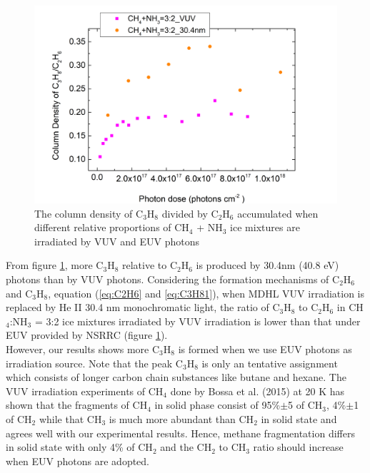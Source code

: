 \begin{figure}
\centering
\includegraphics[width=\textwidth]{figures/chapter3/VUV_EUV_C3H8_C2H6.png}
\caption{The column density of C$_3$H$_8$ divided by C$_2$H$_6$ accumulated when different relative proportions of CH$_4$ + NH$_3$ ice mixtures are irradiated by VUV and EUV photons}
\label{fig:NSRRC_Lab_C3H8_C2H6}
\end{figure}


From figure \ref{fig:NSRRC_Lab_C3H8_C2H6}, more C$_3$H$_8$ relative to C$_2$H$_6$ is produced by 30.4nm (40.8 eV) photons than by VUV photons. Considering the formation mechanisms of C$_2$H$_6$ and C$_3$H$_8$, equation (\ref{eq:C2H6} and \ref{eq:C3H81}), when MDHL VUV irradiation is replaced by He II 30.4 nm monochromatic light, the ratio of C$_3$H$_8$ to C$_2$H$_6$ in CH$_4$:NH$_3$ = 3:2 ice mixtures irradiated by VUV irradiation is lower than that under EUV provided by NSRRC (figure \ref{fig:NSRRC_Lab_C3H8_C2H6}).\\

 However, our results shows more C$_3$H$_8$ is formed when we use EUV photons as irradiation source. Note that the peak C$_3$H$_8$ is only an tentative assignment which consists of longer carbon chain substances like butane and hexane. The VUV irradiation experiments of CH$_4$ done by Bossa et al. (2015)\cite{bossa2015methane} at 20 K has shown that the fragments of CH$_4$ in solid phase consist of 95\%$\pm$5 of CH$_3$, 4\%$\pm$1 of CH$_2$ while that CH$_3$ is much more abundant than CH$_2$ in solid state and agrees well with our experimental results. Hence, methane fragmentation differs in solid state with only 4\% of CH$_2$ and the CH$_2$ to CH$_3$ ratio should increase when EUV photons are adopted. \\


